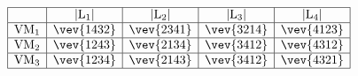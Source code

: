\documentclass[12pt]{article}
\def\rL{{\rm L}}
\let\bm\relax
\newcommand{\bm}[1]{{\boldsymbol{#1}}}
\begin{document}
\begin{table}[H]
$$
\begin{array}{|c|c|c|c|c|} 
\hline
 & |{\bm {\rL}}_1 | & |{\bm {\rL}}_2| & |{\bm {\rL}}_3 |& | {\bm {\rL}}_4 |  \\  \hline
{\rm VM}{}_1 &  \vev{1432} &  \vev{2341} &   \vev{3214} &  \vev{4123} 
\\ \hline
{\rm VM}{}_2 &  \vev{1243} &   \vev{2134} &  \vev{3412} &  \vev{4312} 
\\ \hline
{\rm VM}{}_3 &  
\vev{1234} &  \vev{2143} & \vev{3412} &  \vev{4321}
\\ \hline
    \end{array}
$$
\caption{Absolute Value Element Decomposition of L-matrices}
\label{t:0braneXzX}
\end{table}
\end{document}
